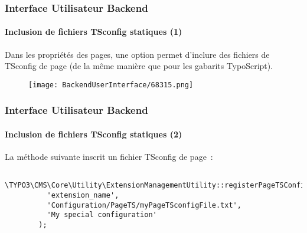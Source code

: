 \begin{frame}[fragile]
	\frametitle{Interface Utilisateur Backend}
	\framesubtitle{Inclusion de fichiers TSconfig statiques (1)}

	Dans les propriétés des pages, une option permet d'inclure des fichiers de TSconfig de page
	(de la même manière que pour les gabarits TypoScript).

	\begin{figure}
		\texttt{[image: BackendUserInterface/68315.png]}
	\end{figure}

\end{frame}

\begin{frame}[fragile]
	\frametitle{Interface Utilisateur Backend}
	\framesubtitle{Inclusion de fichiers TSconfig statiques (2)}

	\lstset{basicstyle=\tiny\ttfamily}

	La méthode suivante inscrit un fichier TSconfig de page~:

	\begin{lstlisting}
		\TYPO3\CMS\Core\Utility\ExtensionManagementUtility::registerPageTSConfigFile(
		  'extension_name',
		  'Configuration/PageTS/myPageTSconfigFile.txt',
		  'My special configuration'
		);
	\end{lstlisting}

\end{frame}


